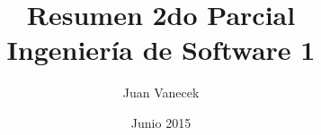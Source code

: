 \title{Resumen 2do Parcial \\ Ingenier\'ia de Software 1}
\author{Juan Vanecek}
\date{Junio 2015}
\begin{titlepage}
 \maketitle
\end{titlepage}

